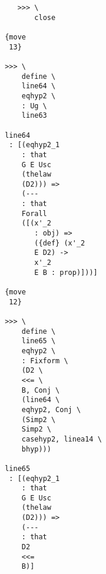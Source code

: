 \documentclass[12pt]{article}
\begin{document}
\begin{verbatim}
                                          >>> \
                                              close

                                       {move 
                                        13}

                                       >>> \
                                           define \
                                           line64 \
                                           eqhyp2 \
                                           : Ug \
                                           line63

                                       line64 
                                        : [(eqhyp2_1 
                                           : that 
                                           G E Usc 
                                           (thelaw 
                                           (D2))) => 
                                           (--- 
                                           : that 
                                           Forall 
                                           ([(x'_2 
                                              : obj) => 
                                              ({def} (x'_2 
                                              E D2) -> 
                                              x'_2 
                                              E B : prop)]))]

                                       {move 
                                        12}

                                       >>> \
                                           define \
                                           line65 \
                                           eqhyp2 \
                                           : Fixform \
                                           (D2 \
                                           <<= \
                                           B, Conj \
                                           (line64 \
                                           eqhyp2, Conj \
                                           (Simp2 \
                                           Simp2 \
                                           casehyp2, linea14 \
                                           bhyp)))

                                       line65 
                                        : [(eqhyp2_1 
                                           : that 
                                           G E Usc 
                                           (thelaw 
                                           (D2))) => 
                                           (--- 
                                           : that 
                                           D2 
                                           <<= 
                                           B)]


\end{verbatim}
\end{document}
